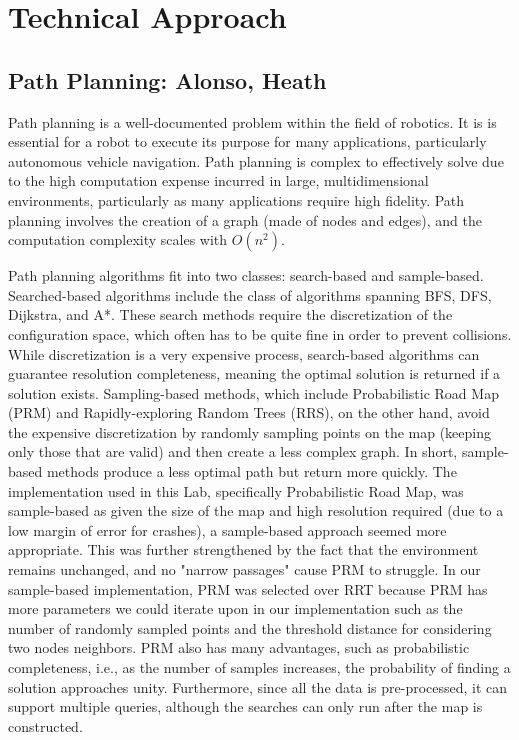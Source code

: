 \documentclass{article}
\begin{document}
\section{Technical Approach}

\subsection{Path Planning: Alonso, Heath}

Path planning is a well-documented problem within the field of robotics. It is is essential for a robot to execute its purpose for many applications, particularly autonomous vehicle navigation. Path planning is complex to effectively solve due to the high computation expense incurred in large, multidimensional environments, particularly as many applications require high fidelity. Path planning involves the creation of a graph (made of nodes and edges), and the computation complexity scales with $O(n^2)$. 

Path planning algorithms fit into two classes: search-based and sample-based. Searched-based algorithms include the class of algorithms spanning BFS, DFS, Dijkstra, and A*. These search methods require the discretization of the configuration space, which often has to be quite fine in order to prevent collisions. While discretization is a very expensive process, search-based algorithms can guarantee resolution completeness, meaning the optimal solution is returned if a solution exists. Sampling-based methods, which include Probabilistic Road Map (PRM) and Rapidly-exploring Random Trees (RRS), on the other hand, avoid the expensive discretization by randomly sampling points on the map (keeping only those that are valid) and then create a less complex graph. In short, sample-based methods produce a less optimal path but return more quickly. The implementation used in this Lab, specifically Probabilistic Road Map, was sample-based as given the size of the map and high resolution required (due to a low margin of error for crashes), a sample-based approach seemed more appropriate. This was further strengthened by the fact that the environment remains unchanged, and no "narrow passages" cause PRM to struggle. In our sample-based implementation, PRM was selected over RRT because PRM has more parameters we could iterate upon in our implementation such as the number of randomly sampled points and the threshold distance for considering two nodes neighbors. PRM also has many advantages, such as probabilistic completeness, i.e., as the number of samples increases, the probability of finding a solution approaches unity. Furthermore, since all the data is pre-processed, it can support multiple queries, although the searches can only run after the map is constructed.
\end{document}

